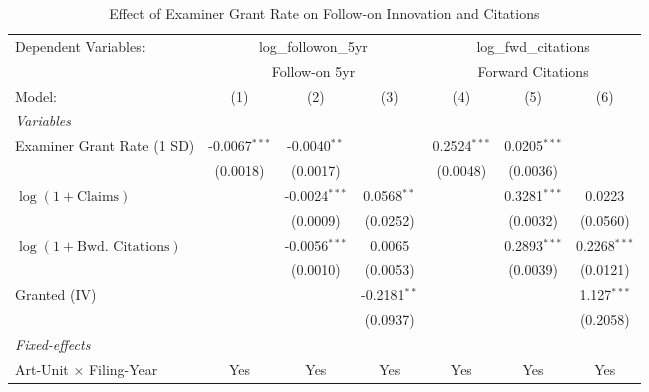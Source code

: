 
\begin{table}[htbp]
   \caption{\label{tab:main} Effect of Examiner Grant Rate on Follow-on Innovation and Citations}
   \centering
   \begin{adjustbox}{max width=\textwidth}
   \begin{tabular}{lcccccc}
      \tabularnewline \midrule \midrule
      Dependent Variables: & \multicolumn{3}{c}{log\_followon\_5yr} & \multicolumn{3}{c}{log\_fwd\_citations}\\
       & \multicolumn{3}{c}{Follow-on 5yr} & \multicolumn{3}{c}{Forward Citations} \\ 
      Model:                              & (1)             & (2)             & (3)            & (4)            & (5)            & (6)\\  
      \midrule
      \emph{Variables}\\
      Examiner Grant Rate (1 SD)          & -0.0067$^{***}$ & -0.0040$^{**}$  &                & 0.2524$^{***}$ & 0.0205$^{***}$ &   \\   
                                          & (0.0018)        & (0.0017)        &                & (0.0048)       & (0.0036)       &   \\   
      $\log(1 + \text{Claims})$           &                 & -0.0024$^{***}$ & 0.0568$^{**}$  &                & 0.3281$^{***}$ & 0.0223\\   
                                          &                 & (0.0009)        & (0.0252)       &                & (0.0032)       & (0.0560)\\   
      $\log(1 + \text{Bwd. Citations})$   &                 & -0.0056$^{***}$ & 0.0065         &                & 0.2893$^{***}$ & 0.2268$^{***}$\\   
                                          &                 & (0.0010)        & (0.0053)       &                & (0.0039)       & (0.0121)\\   
      Granted (IV)                        &                 &                 & -0.2181$^{**}$ &                &                & 1.127$^{***}$\\   
                                          &                 &                 & (0.0937)       &                &                & (0.2058)\\   
      \midrule
      \emph{Fixed-effects}\\
      Art-Unit $\times$ Filing-Year       & Yes             & Yes             & Yes            & Yes            & Yes            & Yes\\  

\end{tabular}
\end{adjustbox}
\end{table}
